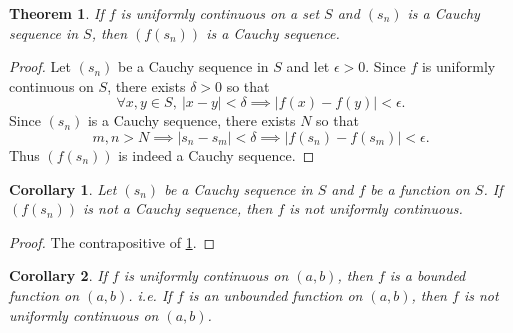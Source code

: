 \documentclass[12pt, lettersize]{book}
\theoremstyle{plain}
\newtheorem{thm}{Theorem}[section]
\newtheorem{cor}{Corollary}[thm]
\theoremstyle{definition}
\theoremstyle{remark}
\begin{document}
			\begin{thm}\label{thm:19.4}
			If $f$ is uniformly continuous on a set $S$ and $(s_n)$ is a Cauchy sequence in $S$, then $(f(s_n))$ is a 
			Cauchy sequence.
			\end{thm}
			\begin{proof}
			Let $(s_n)$ be a Cauchy sequence in $S$ and let $\epsilon>0$. Since $f$ is uniformly continuous on $S$, there
			exists $\delta>0$ so that
			\begin{displaymath}
				\forall x,y\in S,\ |x-y|<\delta\implies|f(x)-f(y)|<\epsilon.
			\end{displaymath}
			Since $(s_n)$ is a Cauchy sequence, there exists $N$ so that
			\begin{displaymath}
				m,n>N\implies|s_n-s_m|<\delta\implies|f(s_n)-f(s_m)|<\epsilon.
			\end{displaymath}
			Thus $(f(s_n))$ is indeed a Cauchy sequence.
			\end{proof}
			\begin{cor}
			Let $(s_n)$ be a Cauchy sequence in $S$ and $f$ be a function on $S$. If $(f(s_n))$ is not a Cauchy sequence, then $f$ is not \emph{uniformly continuous}.
			\end{cor}
			\begin{proof}
				The contrapositive of \ref{thm:19.4}.
			\end{proof}
			\begin{cor}
			If $f$ is uniformly continuous on $(a,b)$, then $f$ is a bounded function on $(a,b)$. i.e. If $f$ is an unbounded function on $(a,b)$, then $f$ is not uniformly continuous on $(a,b)$.
			\end{cor}
			
\end{document}

